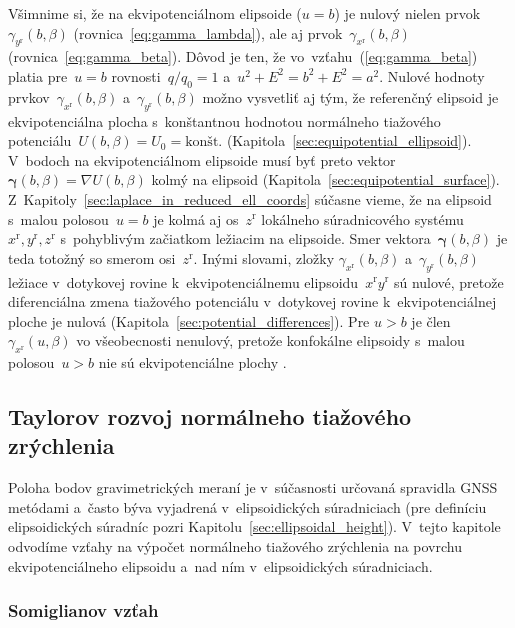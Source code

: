 \documentclass[a4paper, 12pt]{book}
\begin{document}
Všimnime si, že na ekvipotenciálnom elipsoide ($u = b$) je nulový nielen 
prvok~$\gamma_{y^\mathrm{r}}(b, \beta)$ (rovnica~\ref{eq:gamma_lambda}), ale aj 
prvok~$\gamma_{x^\mathrm{r}}(b, \beta)$ (rovnica~\ref{eq:gamma_beta}).  Dôvod 
je ten, že vo~vzťahu~(\ref{eq:gamma_beta}) platia pre~$u = b$ rovnosti~$q 
\slash q_0 = 1$ a~$u^2 + E^2 = b^2 + E^2 = a^2$.  Nulové hodnoty 
prvkov~$\gamma_{x^\mathrm{r}}(b, \beta)$ a~$\gamma_{y^\mathrm{r}}(b, \beta)$ 
možno vysvetliť aj tým, že referenčný elipsoid je ekvipotenciálna plocha 
s~konštantnou hodnotou normálneho tiažového potenciálu~$U(b, \beta) = U_0 
= \textrm{kon\v{s}t.}$
(Kapitola~\ref{sec:equipotential_ellipsoid}).  V~bodoch na ekvipotenciálnom 
elipsoide musí byť preto vektor~$\boldsymbol \gamma(b, \beta) = \nabla U(b, 
\beta)$ kolmý na elipsoid (Kapitola~\ref{sec:equipotential_surface}).  
Z~Kapitoly~\ref{sec:laplace_in_reduced_ell_coords} súčasne vieme, že na 
elipsoid s~malou polosou~$u = b$ je kolmá aj os~$z^\mathrm{r}$ lokálneho 
súradnicového systému~$x^\mathrm{r}, y^\mathrm{r}, z^\mathrm{r}$ s~pohyblivým 
začiatkom ležiacim na elipsoide.  Smer vektora~$\boldsymbol \gamma(b, \beta)$ 
je teda totožný so smerom osi~$z^\mathrm{r}$.  Inými slovami, zložky 
$\gamma_{x^\mathrm{r}}(b, \beta)$ a~$\gamma_{y^\mathrm{r}}(b, \beta)$ ležiace 
v~dotykovej rovine k~ekvipotenciálnemu elipsoidu~$x^\mathrm{r} y^\mathrm{r}$ sú 
nulové, pretože diferenciálna zmena tiažového potenciálu v~dotykovej rovine 
k~ekvipotenciálnej ploche je nulová (Kapitola~\ref{sec:potential_differences}).  
Pre $u > b$ je člen $\gamma_{x^\mathrm{r}}(u, \beta)$ vo všeobecnosti nenulový, 
pretože konfokálne elipsoidy s~malou polosou~$u > b$ nie sú ekvipotenciálne 
plochy \parencite{MoritzPhysicalGeodesy}.



\subsection{Taylorov rozvoj normálneho tiažového zrýchlenia}
\label{sec:normal_gravity_taylor}

Poloha bodov gravimetrických meraní je v~súčasnosti určovaná spravidla GNSS 
metódami a~často býva vyjadrená v~elipsoidických súradniciach (pre definíciu 
elipsoidických súradníc pozri Kapitolu~\ref{sec:ellipsoidal_height}).  V~tejto 
kapitole odvodíme vzťahy na výpočet normálneho tiažového zrýchlenia na povrchu 
ekvipotenciálneho elipsoidu a~nad ním v~elipsoidických súradniciach.

\subsubsection{Somiglianov vzťah}
\label{sec:somigliana}
\end{document}
